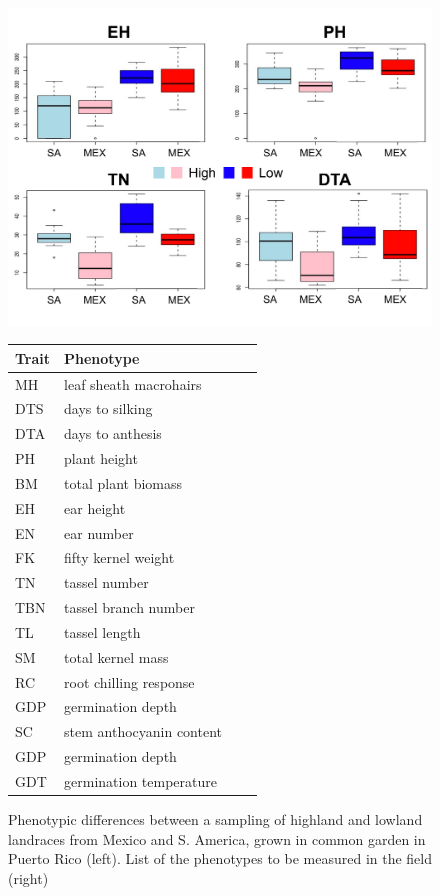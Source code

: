 \begin{figure}[ht!]
	\begin{minipage}{0.5\textwidth}
    		\centering
   		\includegraphics[width=\textwidth]{fourtraits.pdf}
  	\end{minipage}%
  	\begin{minipage}[c]{0.50\textwidth}
  		\centering
		\begin{tabular}{llcc}\\\toprule  
		{\bf Trait} & {\bf Phenotype}  \\\midrule
		MH & leaf sheath macrohairs  \\
		DTS & days to silking  \\
		DTA & days to anthesis  \\
		PH & plant height 			\\
		BM & total plant biomass 	\\
		EH & ear height			 \\
		EN & ear number			 \\
		FK & fifty kernel weight \\
		TN & tassel number \\
		TBN & tassel branch number \\
		TL & tassel length \\
		SM & total kernel mass \\
		RC & root chilling response \\
		GDP & germination depth \\
		SC & stem anthocyanin content \\
		GDP & germination depth \\
		GDT & germination temperature \\\bottomrule
		\end{tabular}
	\end{minipage}
 	\caption{ Phenotypic differences between a sampling of highland and lowland landraces from Mexico and S. America, grown in common garden in Puerto Rico (left). List of the phenotypes to be measured in the field (right) }%
	\label{fig:phenos}
\end{figure}


